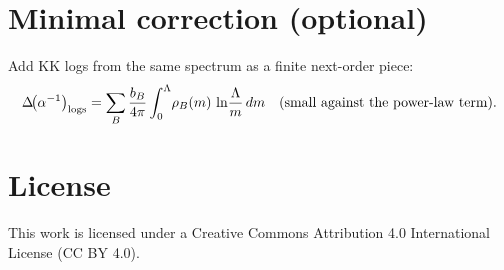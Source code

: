 \documentclass[11pt]{article}
\begin{document}
\section*{Minimal correction (optional)}
Add KK logs from the same spectrum as a finite next-order piece:
\[
\Delta\!\big(\alpha^{-1}\big)_{\rm logs} = \sum_B \frac{b_B}{4\pi}\int_0^{\Lambda}\!\rho_B(m)\,\ln\!\frac{\Lambda}{m}\,dm \quad (\text{small against the power-law term}).
\]


\section*{License}
This work is licensed under a Creative Commons Attribution 4.0 International License (CC BY 4.0).
\end{document}
